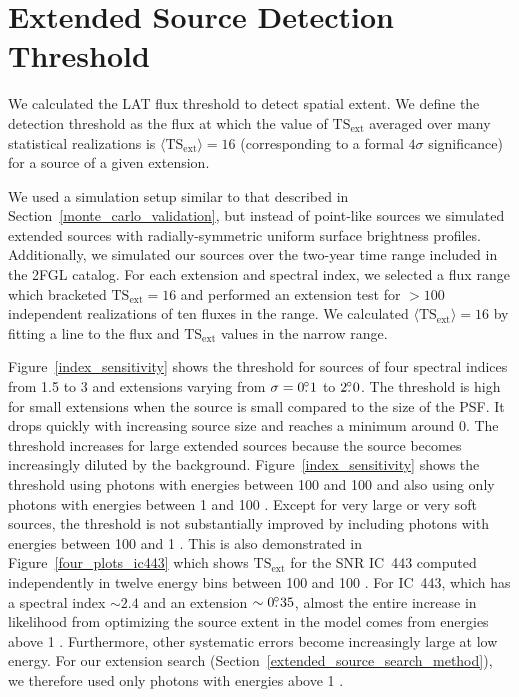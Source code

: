 \documentclass[12pt,preprint]{aastex}
\newcommand{\mev}{\text{MeV}\xspace}
\newcommand{\gev}{\text{GeV}\xspace}
\newcommand{\tsext}{{\ensuremath{\text{TS}_{\text{ext}}}}\xspace}
\begin{document}
\section{Extended Source Detection Threshold}
\label{extension_sensitivity}

We calculated the LAT flux 
threshold to detect spatial extent. We define the detection threshold as the flux at
which the value of $\tsext$ averaged over many statistical realizations is
$\langle\tsext\rangle=16$ 
(corresponding to a formal $4\sigma$ significance)
for a source of a given extension.

We used a simulation setup similar to that described in
Section~\ref{monte_carlo_validation}, but instead of point-like sources
we simulated extended sources with radially-symmetric uniform surface
brightness profiles. Additionally, we simulated our sources over the two-year
time range included in the 2FGL catalog.  For each extension and spectral index,
we selected a flux range which bracketed $\tsext=16$ and performed an
extension test for $>100$ independent realizations of ten fluxes in
the range.  We calculated $\langle\tsext\rangle=16$ by fitting a line
to the flux and $\tsext$ values in the narrow range.

Figure~\ref{index_sensitivity} shows the threshold for sources of four
spectral indices from 1.5 to 3 and extensions varying from $\sigma=0\mbox{$.\!\!^\circ$}1$
to $2\mbox{$.\!\!^\circ$}0$.  
The threshold is high for small extensions when the
source is 
small compared to the size of the PSF. 
It drops quickly with increasing source size and reaches
a minimum around 0. 
The threshold increases
for large extended sources because the source becomes
increasingly diluted by the background.
Figure~\ref{index_sensitivity} shows
the threshold using photons with energies between 100 \mev and 100 \gev
and also using only photons with energies between 1 \gev and 100 \gev.
Except for very large or very soft
sources, the threshold is
not substantially improved by including photons with energies between 100 \mev and
1 \gev.  This is also demonstrated in Figure~\ref{four_plots_ic443}
which shows \tsext for the SNR IC~443 computed independently in twelve
energy bins between 100 \mev and 100 \gev. For IC~443, which has a
spectral index $\sim2.4$ and an extension $\sim0\mbox{$.\!\!^\circ$}35$, 
almost the entire 
increase in likelihood from optimizing the source extent in the model
comes
from energies above 1 \gev.  Furthermore, other systematic errors
become increasingly large at low energy. For our extension search
(Section~\ref{extended_source_search_method}),
we therefore used only photons with energies above 1 \gev.
\end{document}
